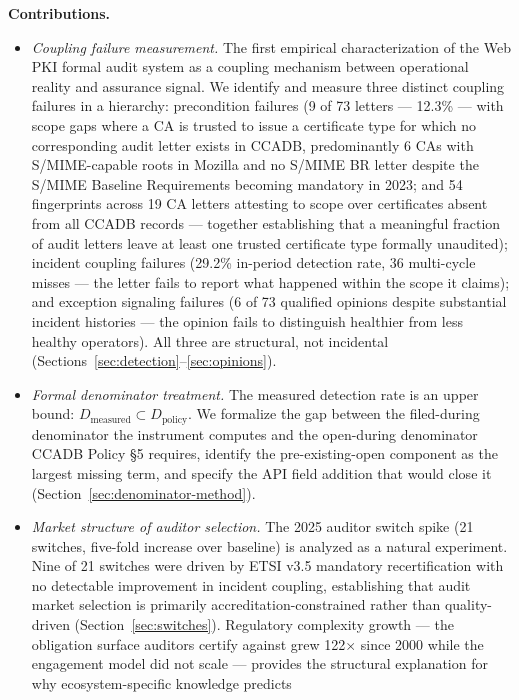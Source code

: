 \documentclass[10pt,twocolumn,letterpaper]{article}
\begin{document}
\textbf{Contributions.}
\begin{itemize}[noitemsep,topsep=2pt]
\item \textit{Coupling failure measurement.} The first empirical
  characterization of the Web PKI formal audit system as a coupling
  mechanism between operational reality and assurance signal. We
  identify and measure three distinct coupling failures in a hierarchy:
  precondition failures (9 of 73 letters --- 12.3\% --- with scope gaps
  where a CA is trusted to issue a certificate type for which no
  corresponding audit letter exists in CCADB, predominantly 6 CAs with
  S/MIME-capable roots in Mozilla and no S/MIME BR letter despite the S/MIME
  Baseline Requirements becoming mandatory in 2023; and 54 fingerprints
  across 19 CA letters attesting to scope over certificates absent from
  all CCADB records --- together establishing that a meaningful fraction of audit
  letters leave at least one trusted certificate type formally unaudited);
  incident coupling failures (29.2\%
  in-period detection rate, 36 multi-cycle misses --- the letter fails to
  report what happened within the scope it claims); and exception signaling
  failures (6 of 73 qualified opinions despite substantial incident
  histories --- the opinion fails to distinguish healthier from less healthy
  operators). All three are structural, not incidental
  (Sections~\ref{sec:detection}--\ref{sec:opinions}).
\item \textit{Formal denominator treatment.} The measured detection
  rate is an upper bound: $D_\text{measured} \subset D_\text{policy}$.
  We formalize the gap between the filed-during denominator the
  instrument computes and the open-during denominator CCADB Policy
  \S5 requires, identify the pre-existing-open component as the
  largest missing term, and specify the API field addition that
  would close it (Section~\ref{sec:denominator-method}).
\item \textit{Market structure of auditor selection.} The 2025 auditor
  switch spike (21 switches, five-fold increase over baseline) is
  analyzed as a natural experiment. Nine of 21 switches were driven
  by ETSI v3.5 mandatory recertification with no detectable improvement
  in incident coupling, establishing that audit market selection is
  primarily accreditation-constrained rather than quality-driven
  (Section~\ref{sec:switches}). Regulatory complexity growth --- the
  obligation surface auditors certify against grew 122$\times$ since
  2000 while the engagement model did not scale --- provides the
  structural explanation for why ecosystem-specific knowledge predicts

\end{itemize}
\end{document}
